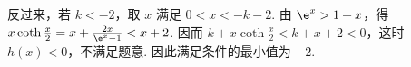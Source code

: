\documentclass[UTF8,a4paper,oneside,11pt]{ctexbook}
\begin{document}
\begin{solution}
\begin{enumerate}
反过来，若 \(k<-2\)，取 \(x\) 满足 \(0<x<-k-2\). 由 \(\e^x>1+x\)，得 \(x\coth \frac{x}{2}=x+\frac{2x}{\e^x-1}<x+2\). 因而 \(k+x\coth \frac{x}{2}<k+x+2<0\)，这时 \(h(x)<0\)，不满足题意.
因此满足条件的最小值为 \(-2\).
\end{enumerate}
\end{solution}

\end{document}
